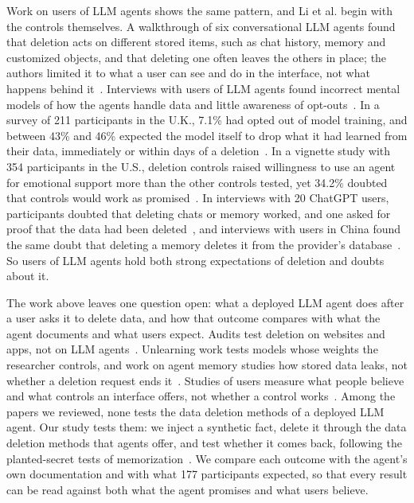 Work on users of LLM agents shows the same pattern, and Li et al. begin with the controls themselves. A walkthrough of six conversational LLM agents found that deletion acts on different stored items, such as chat history, memory and customized objects, and that deleting one often leaves the others in place; the authors limited it to what a user can see and do in the interface, not what happens behind it~\cite{li2026privacy}. Interviews with users of LLM agents found incorrect mental models of how the agents handle data and little awareness of opt-outs~\cite{zhang2024fair}. In a survey of 211 participants in the U.K., 7.1\% had opted out of model training, and between 43\% and 46\% expected the model itself to drop what it had learned from their data, immediately or within days of a deletion~\cite{malki2025hoovered}. In a vignette study with 354 participants in the U.S., deletion controls raised willingness to use an agent for emotional support more than the other controls tested, yet 34.2\% doubted that controls would work as promised~\cite{kwesi2026impact}. In interviews with 20 ChatGPT users, participants doubted that deleting chats or memory worked, and one asked for proof that the data had been deleted~\cite{chen2026relational}, and interviews with users in China found the same doubt that deleting a memory deletes it from the provider's database~\cite{zhang2025understanding}. So users of LLM agents hold both strong expectations of deletion and doubts about it.

The work above leaves one question open: what a deployed LLM agent does after a user asks it to delete data, and how that outcome compares with what the agent documents and what users expect. Audits test deletion on websites and apps, not on LLM agents~\cite{rupp2022leave,yan2025sign}. Unlearning work tests models whose weights the researcher controls, and work on agent memory studies how stored data leaks, not whether a deletion request ends it~\cite{shi2025muse,wang2025unveiling}. Studies of users measure what people believe and what controls an interface offers, not whether a control works~\cite{li2026privacy,malki2025hoovered}. Among the papers we reviewed, none tests the data deletion methods of a deployed LLM agent. Our study tests them: we inject a synthetic fact, delete it through the data deletion methods that agents offer, and test whether it comes back, following the planted-secret tests of memorization~\cite{carlini2019secret}. We compare each outcome with the agent's own documentation and with what 177 participants expected, so that every result can be read against both what the agent promises and what users believe.
